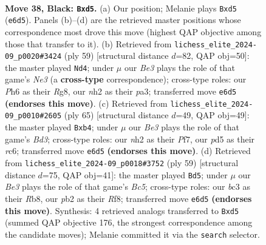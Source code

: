 \documentclass[11pt]{article}
\begin{document}
\clearpage

\begin{figure}[p]\centering
\begin{subfigure}{0.46\textwidth}\centering
\resizebox{\linewidth}{!}{%
\newchessgame
\chessboard[
  setfen={1k5r/rp2b1p1/p1p1b2p/P2P1p2/R1p4P/2B1P1P1/1P3P1N/2K4R b - - 0 38},
  showmover=false,
  pgfstyle=straightmove, color=movearrow, markmove={e6-d5}
]}
\caption{}
\end{subfigure}\hfill
\begin{subfigure}{0.46\textwidth}\centering
\resizebox{\linewidth}{!}{%
\newchessgame
\chessboard[
  setfen={2r3r1/4k3/3bn1p1/1pp1pP1p/p3P2P/P1BN4/1PP3R1/1K4R1 b - - 0 30},
  showmover=false,
  pgfstyle=straightmove, color=movearrow, markmove={e6-d4}
]}
\caption{}
\end{subfigure}
\\[4pt]
\begin{subfigure}{0.46\textwidth}\centering
\resizebox{\linewidth}{!}{%
\newchessgame
\chessboard[
  setfen={1r4k1/4pp1p/2Rb2p1/1p1PP3/rP1R1P2/p5PP/P7/5BK1 b - - 0 33},
  showmover=false,
  pgfstyle=straightmove, color=movearrow, markmove={d6-b4}
]}
\caption{}
\end{subfigure}\hfill
\begin{subfigure}{0.46\textwidth}\centering
\resizebox{\linewidth}{!}{%
\newchessgame
\chessboard[
  setfen={1r3r1k/3pb1pp/4p3/p1P1Pp2/1Pbp1P2/P7/1R2BNPP/1R4K1 b - - 9 30},
  showmover=false,
  pgfstyle=straightmove, color=movearrow, markmove={c4-d5}
]}
\caption{}
\end{subfigure}
\caption{\textbf{Move 38, Black: \texttt{Bxd5}.} (a) Our position; Melanie plays \texttt{Bxd5} (\texttt{e6d5}). Panels (b)--(d) are the retrieved master positions whose correspondence most drove this move (highest QAP objective among those that transfer to it). (b) Retrieved from \texttt{lichess\_elite\_2024-09\_p0020\#3424} (ply 59) [structural distance $d$=82, QAP obj=50]: the master played \texttt{Nd4}; under $\mu$ our \emph{Be3} plays the role of that game's \emph{Ne3} (a \textbf{cross-type} correspondence); cross-type roles: our \emph{P}h6 as their \emph{R}g8, our \emph{n}h2 as their \emph{p}a3; transferred move \texttt{e6d5} \textbf{(endorses this move)}. (c) Retrieved from \texttt{lichess\_elite\_2024-09\_p0010\#2605} (ply 65) [structural distance $d$=49, QAP obj=49]: the master played \texttt{Bxb4}; under $\mu$ our \emph{Be3} plays the role of that game's \emph{Bd3}; cross-type roles: our \emph{n}h2 as their \emph{P}f7, our \emph{p}d5 as their \emph{r}c6; transferred move \texttt{e6d5} \textbf{(endorses this move)}. (d) Retrieved from \texttt{lichess\_elite\_2024-09\_p0018\#3752} (ply 59) [structural distance $d$=75, QAP obj=41]: the master played \texttt{Bd5}; under $\mu$ our \emph{Be3} plays the role of that game's \emph{Bc5}; cross-type roles: our \emph{b}c3 as their \emph{R}b8, our \emph{p}b2 as their \emph{R}f8; transferred move \texttt{e6d5} \textbf{(endorses this move)}. Synthesis: 4 retrieved analogs transferred to \texttt{Bxd5} (summed QAP objective 176, the strongest correspondence among the candidate moves); Melanie committed it via the \texttt{search} selector.}
\label{fig:thought-m75}
\end{figure}
\end{document}
